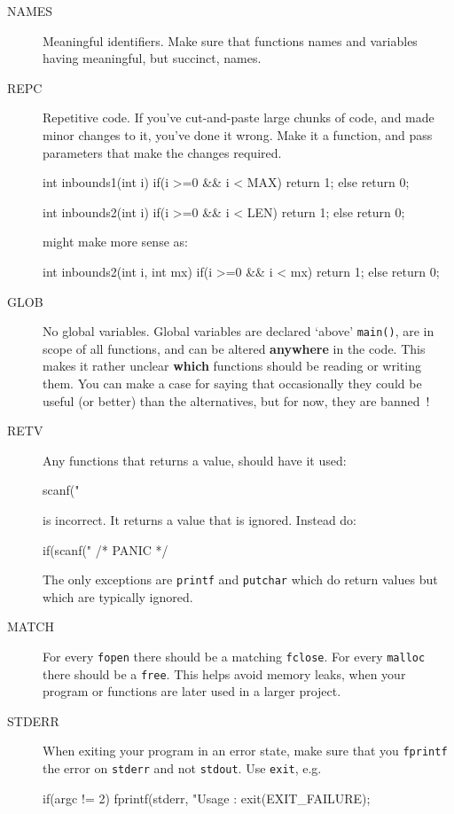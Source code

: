 \begin{description}
\item[NAMES] Meaningful identifiers. Make sure that functions names and variables having meaningful, but succinct,  names.

\item[REPC] Repetitive code. If you've cut-and-paste large chunks of code, and made minor changes to it, you've done it wrong. Make it a function, and pass parameters that make the changes required.
\begin{codesnippet}
int inbounds1(int i){
   if(i >=0 && i < MAX){
      return 1;
   }
   else{ 
      return 0;
   }
}

int inbounds2(int i){
   if(i >=0 && i < LEN){
      return 1;
   }
   else{ 
      return 0;
   }
}
\end{codesnippet}
might make more sense as:
\begin{codesnippet}
int inbounds2(int i, int mx){
   if(i >=0 && i < mx){
      return 1;
   }
   else{ 
      return 0;
   }
}
\end{codesnippet}

\item[GLOB] No global variables. Global variables are declared `above' \verb^main()^, are in scope of all functions, and can be altered {\bf anywhere} in the code. This makes it rather unclear {\bf which} functions should be reading or writing them. You can make a case for saying that occasionally they could be useful (or better) than the alternatives, but for now, they are banned~!

\item[RETV] Any functions that returns a value, should have it used:
\begin{codesnippet}
scanf("%
\end{codesnippet}
is incorrect. It returns a value that is ignored. Instead do:
\begin{codesnippet}
	if(scanf("%
	   /* PANIC */
\end{codesnippet}

The only exceptions are \verb^printf^ and \verb^putchar^ which do return values but
which are typically ignored.

\item[MATCH] For every \verb^fopen^ there should be a matching \verb^fclose^.
For every \verb^malloc^ there should be a \verb^free^.
This helps avoid memory leaks, when your program or functions are later used
in a larger project.

\item[STDERR] When exiting your program in an error state, make sure that you \verb^fprintf^ the error on \verb^stderr^ and not \verb^stdout^. Use \verb^exit^, e.g.
\begin{codesnippet}
if(argc != 2){
   fprintf(stderr, "Usage : %
   exit(EXIT_FAILURE);
}
\end{codesnippet}


\end{description}

